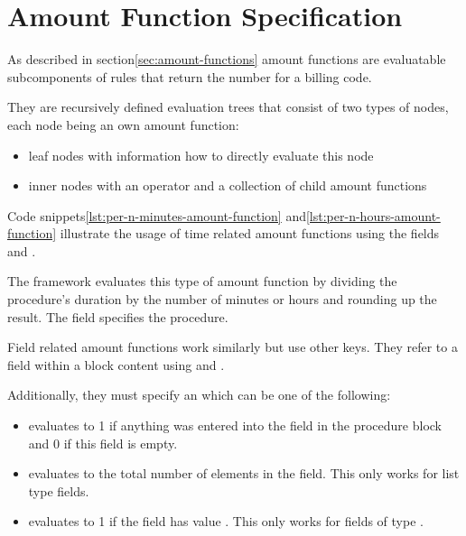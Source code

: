 \section{Amount Function Specification}\label{sec:amount-function-specification}


As described in section\ref{sec:amount-functions} amount functions are evaluatable subcomponents of rules that return
the number for a billing code.

They are recursively defined evaluation trees that consist of two types of nodes, each node being an own amount function:
\begin{itemize}
    \item leaf nodes with information how to directly evaluate this node
    \item inner nodes with an operator and a collection of child amount functions
\end{itemize}

Code snippets\ref{lst:per-n-minutes-amount-function} and\ref{lst:per-n-hours-amount-function} illustrate the usage of time related
amount functions using the fields and .





The framework evaluates this type of amount function by dividing the procedure's duration by the number of minutes or hours and rounding up the result.
The  field specifies the procedure.

Field related amount functions work similarly but use other keys.
They refer to a field within a block content using  and .

Additionally, they must specify an  which can be one of the following:

\begin{itemize}
    \item {} evaluates to 1 if anything was entered into the field in the procedure block and 0 if this field is empty.
    \item {} evaluates to the total number of elements in the field.
    This only works for list type fields.
    \item {} evaluates to 1 if the field has value .
    This only works for fields of type .
\end{itemize}

